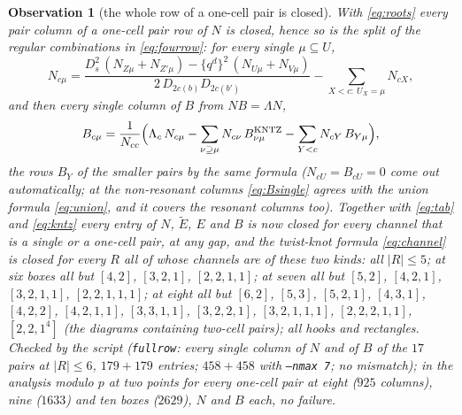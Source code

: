 \documentclass[11pt]{article}
\newtheorem{observation}{Observation}
\newcommand{\Lam}{\Lambda}
\newcommand{\Et}{\widetilde{E}}
\newcommand{\LMPH}[1]{\texttt{#1}}
\begin{document}
\begin{observation}[the whole row of a one-cell pair is closed]\label{obs:fullrow}
With \eqref{eq:roots} every pair column of a one-cell pair row of $N$ is closed, hence so is the split of the regular
combinations in \eqref{eq:fourrow}: for every single $\mu\subseteq U$,
\begin{equation}\label{eq:Nsingle}
N_{c\mu}=\frac{D_s^2\,(N_{Z\mu}+N_{Z'\mu})-\{q^d\}^2\,(N_{U\mu}+N_{V\mu})}{2\,D_{2c(b)}D_{2c(b')}}
-\sum_{X<c:\ U_X=\mu}N_{cX},
\end{equation}
and then every single column of $B$ from $NB=\Lam N$,
\begin{equation}\label{eq:Bsingle}
B_{c\mu}=\frac1{N_{cc}}\Big(\Lam_c\,N_{c\mu}-\sum_{\nu\supseteq\mu}N_{c\nu}\,B^{\rm KNTZ}_{\nu\mu}
-\sum_{Y<c}N_{cY}\,B_{Y\mu}\Big),
\end{equation}
the rows $B_Y$ of the smaller pairs by the same formula ($N_{cU}=B_{cU}=0$ come out automatically; at the non-resonant
columns \eqref{eq:Bsingle} agrees with the union formula \eqref{eq:union}, and it covers the resonant columns too).
Together with \eqref{eq:tab} and \eqref{eq:kntz} every entry of $N$, $\Et$, $E$ and $B$ is now closed for every
channel that is a single or a one-cell pair, at any gap, and the twist-knot formula \eqref{eq:channel} is closed for
every $R$ all of whose channels are of these two kinds: all $|R|\le5$; at six boxes all but $[4,2]$, $[3,2,1]$,
$[2,2,1,1]$; at seven all but $[5,2]$, $[4,2,1]$, $[3,2,1,1]$, $[2,2,1,1,1]$; at eight all but $[6,2]$, $[5,3]$,
$[5,2,1]$, $[4,3,1]$, $[4,2,2]$, $[4,2,1,1]$, $[3,3,1,1]$, $[3,2,2,1]$, $[3,2,1,1,1]$, $[2,2,2,1,1]$, $[2,2,1^4]$
(the diagrams containing two-cell pairs); all hooks and rectangles.  Checked by the script (\LMPH{fullrow}: every
single column of $N$ and of $B$ of the $17$ pairs at $|R|\le6$, $179+179$ entries; $458+458$ with \LMPH{--nmax 7};
no mismatch); in the analysis modulo $p$ at two points for every one-cell pair
at eight ($925$ columns), nine ($1633$) and ten boxes ($2629$), $N$ and $B$ each, no failure.
\end{observation}
\end{document}
